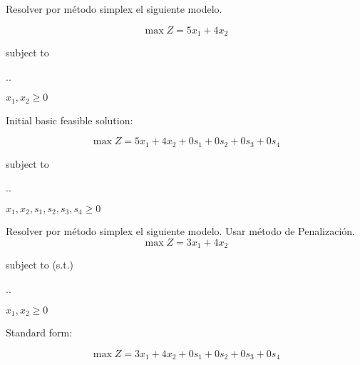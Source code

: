 \documentclass[spanish,letterpaper,11pt]{exam}
\author{Dr. Rafael Torres Escobar}
\begin{document}
\begin{questions}
    \question
    Resolver por método simplex el siguiente modelo.

    \[\max Z = 5x_1 + 4x_2\]

    {\centering
      subject to
    
      \sysdelim..
    
      \vspace{5mm}
      $x_1, x_2  \geq 0$
      \par}

    \begin{solution}
        
        Initial basic feasible solution: 

        \[\max Z = 5x_1 + 4x_2  + 0s_1 + 0s_2 + 0s_3 + 0s_4\]

{\centering
  subject to

  \sysdelim..

  \vspace{5mm}
  $x_1, x_2, s_1, s_2, s_3, s_4  \geq 0$
  \par}  


    \end{solution}

    \vspace{1cm}
    \question
    Resolver por método simplex el siguiente modelo. Usar método de Penalización.
    \[\max Z = 3x_1 + 4x_2 \]

    {\centering
      subject to (s.t.)
  
      \sysdelim..%
  
      \vspace{5mm}
  
      $x_1 , x_2 \geq 0$
    \par}

   \begin{solution}
       
    Standard form: 

    \[\max Z = 3x_1 + 4x_2 + 0s_1 + 0s_2 + 0s_3 + 0s_4 \]


\end{solution}
\end{questions}
\end{document}
